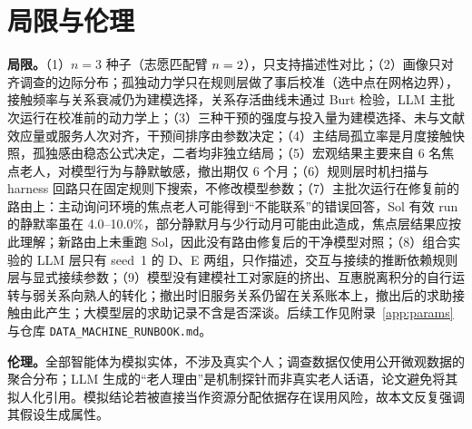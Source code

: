 \documentclass[10.5pt,twocolumn]{ctexart}
\begin{document}
\section{局限与伦理}\label{sec:limits}
\textbf{局限。}（1）$n=3$ 种子（志愿匹配臂 $n=2$），只支持描述性对比；（2）画像只对齐调查的边际分布；孤独动力学只在规则层做了事后校准（选中点在网格边界），接触频率与关系衰减仍为建模选择，关系存活曲线未通过 Burt 检验，LLM 主批次运行在校准前的动力学上；（3）三种干预的强度与投入量为建模选择、未与文献效应量或服务人次对齐，干预间排序由参数决定；（4）主结局孤立率是月度接触快照，孤独感由稳态公式决定，二者均非独立结局；（5）宏观结果主要来自 6 名焦点老人，对模型行为与静默敏感，撤出期仅 6 个月；（6）规则层时机扫描与 harness 回路只在固定规则下搜索，不修改模型参数；（7）主批次运行在修复前的路由上：主动询问环境的焦点老人可能得到``不能联系''的错误回答，Sol 有效 run 的静默率虽在 4.0--10.0\%，部分静默月与少行动月可能由此造成，焦点层结果应按此理解；新路由上未重跑 Sol，因此没有路由修复后的干净模型对照；（8）组合实验的 LLM 层只有 seed~1 的 D、E 两组，只作描述，交互与接续的推断依赖规则层与显式接续参数；（9）模型没有建模社工对家庭的挤出、互惠脱离积分的自行运转与弱关系向熟人的转化；撤出时旧服务关系仍留在关系账本上，撤出后的求助接触由此产生；大模型层的求助记录不含是否深谈。后续工作见附录~\ref{app:params} 与仓库 \texttt{DATA\_MACHINE\_RUNBOOK.md}。

\textbf{伦理。}全部智能体为模拟实体，不涉及真实个人；调查数据仅使用公开微观数据的聚合分布；LLM 生成的``老人理由''是机制探针而非真实老人话语，论文避免将其拟人化引用。模拟结论若被直接当作资源分配依据存在误用风险，故本文反复强调其假设生成属性。




\appendix
\end{document}

